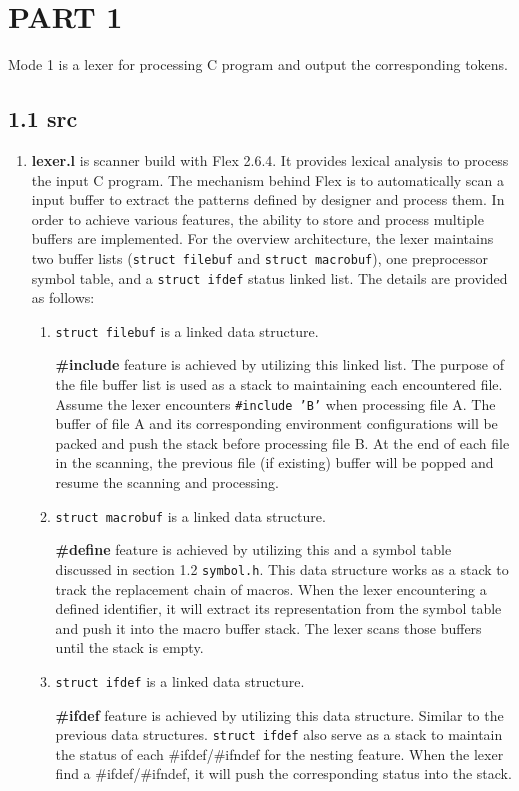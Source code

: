 \section*{PART 1}

Mode 1 is a lexer for processing C program and output the corresponding tokens.

\subsection*{1.1 \large\textbf{src}}
\begin{enumerate}
    \item \textbf{lexer.l} is scanner build with Flex 2.6.4. It provides lexical analysis to process the input C program. The mechanism behind Flex is to automatically scan a input buffer to extract the patterns defined by designer and process them. In order to achieve various features, the ability to store and process multiple buffers are implemented. For the overview architecture, the lexer maintains two buffer lists (\texttt{struct filebuf} and \texttt{struct macrobuf}), one preprocessor symbol table, and a \texttt{struct ifdef} status linked list. The details are provided as follows:
    
    \begin{enumerate} 
        \item \texttt{struct filebuf} is a linked data structure.

        \textbf{\#include} feature is achieved by utilizing this linked list. The purpose of the file buffer list is used as a stack to maintaining each encountered file. Assume the lexer encounters \texttt{\#include 'B'} when processing file A. The buffer of file A and its corresponding environment configurations will be packed and push the stack before processing file B. At the end of each file in the scanning, the previous file (if existing) buffer will be popped and resume the scanning and processing.

        \item \texttt{struct macrobuf} is a linked data structure.

        \textbf{\#define} feature is achieved by utilizing this and a symbol table discussed in section 1.2 \texttt{symbol.h}. This data structure works as a stack to track the replacement chain of macros. When the lexer encountering a defined identifier, it will extract its representation from the symbol table and push it into the macro buffer stack. The lexer scans those buffers until the stack is empty. 

        \item \texttt{struct ifdef} is a linked data structure.
        
        \textbf{\#ifdef} feature is achieved by utilizing this data structure. Similar to the previous data structures. \texttt{struct ifdef} also serve as a stack to maintain the status of each \#ifdef/\#ifndef for the nesting feature. When the lexer find a \#ifdef/\#ifndef, it will push the corresponding status into the stack. 

    \end{enumerate}
\end{enumerate}

